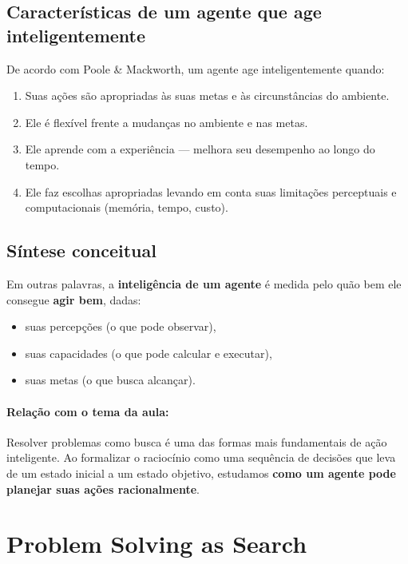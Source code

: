 \documentclass[9pt,a4paper]{extarticle}
\begin{document}
\subsection*{Características de um agente que age inteligentemente}
De acordo com Poole \& Mackworth, um agente age inteligentemente quando:
\begin{enumerate}[label=(\roman*)]
  \item Suas ações são apropriadas às suas metas e às circunstâncias do ambiente.
  \item Ele é flexível frente a mudanças no ambiente e nas metas.
  \item Ele aprende com a experiência — melhora seu desempenho ao longo do tempo.
  \item Ele faz escolhas apropriadas levando em conta suas limitações perceptuais e computacionais (memória, tempo, custo).
\end{enumerate}

\subsection*{Síntese conceitual}
Em outras palavras, a \textbf{inteligência de um agente} é medida pelo quão bem ele consegue \textbf{agir bem}, dadas:
\begin{itemize}
  \item suas percepções (o que pode observar),
  \item suas capacidades (o que pode calcular e executar),
  \item suas metas (o que busca alcançar).
\end{itemize}

\paragraph{Relação com o tema da aula:}  
Resolver problemas como busca é uma das formas mais fundamentais de ação inteligente.  
Ao formalizar o raciocínio como uma sequência de decisões que leva de um estado inicial a um estado objetivo, estudamos \textbf{como um agente pode planejar suas ações racionalmente}.

\section{Problem Solving as Search}
\end{document}
